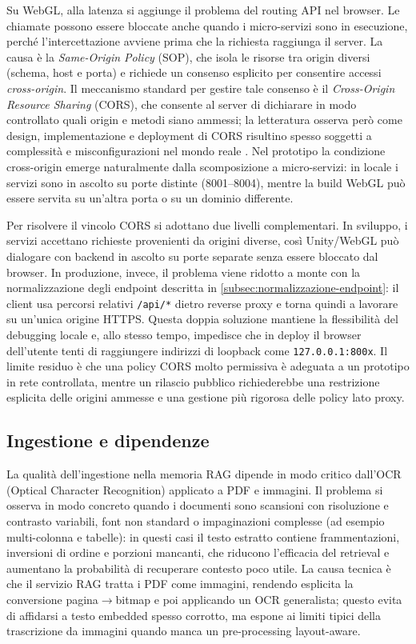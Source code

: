 Su WebGL, alla latenza si aggiunge il problema del routing API nel browser. Le chiamate possono essere bloccate anche quando i micro-servizi sono in esecuzione, perché l'intercettazione avviene prima che la richiesta raggiunga il server. La causa è la \emph{Same-Origin Policy} (SOP), che isola le risorse tra origin diversi (schema, host e porta) e richiede un consenso esplicito per consentire accessi \emph{cross-origin}. Il meccanismo standard per gestire tale consenso è il \emph{Cross-Origin Resource Sharing} (CORS), che consente al server di dichiarare in modo controllato quali origin e metodi siano ammessi; la letteratura osserva però come design, implementazione e deployment di CORS risultino spesso soggetti a complessità e misconfigurazioni nel mondo reale \cite{Chen2018CORS}. Nel prototipo la condizione cross-origin emerge naturalmente dalla scomposizione a micro-servizi: in locale i servizi sono in ascolto su porte distinte (8001--8004), mentre la build WebGL può essere servita su un'altra porta o su un dominio differente.

Per risolvere il vincolo CORS si adottano due livelli complementari. In sviluppo, i servizi accettano richieste provenienti da origini diverse, così Unity/WebGL può dialogare con backend in ascolto su porte separate senza essere bloccato dal browser. In produzione, invece, il problema viene ridotto a monte con la normalizzazione degli endpoint descritta in \autoref{subsec:normalizzazione-endpoint}: il client usa percorsi relativi \texttt{/api/*} dietro reverse proxy e torna quindi a lavorare su un'unica origine HTTPS. Questa doppia soluzione mantiene la flessibilità del debugging locale e, allo stesso tempo, impedisce che in deploy il browser dell'utente tenti di raggiungere indirizzi di loopback come \texttt{127.0.0.1:800x}. Il limite residuo è che una policy CORS molto permissiva è adeguata a un prototipo in rete controllata, mentre un rilascio pubblico richiederebbe una restrizione esplicita delle origini ammesse e una gestione più rigorosa delle policy lato proxy.

\subsection{Ingestione e dipendenze}\label{subsec:ocr-ingestione}\label{subsec:compatibilita-dipendenze}

La qualità dell'ingestione nella memoria RAG dipende in modo critico dall'OCR (Optical Character Recognition) applicato a PDF e immagini. Il problema si osserva in modo concreto quando i documenti sono scansioni con risoluzione e contrasto variabili, font non standard o impaginazioni complesse (ad esempio multi-colonna e tabelle): in questi casi il testo estratto contiene frammentazioni, inversioni di ordine e porzioni mancanti, che riducono l'efficacia del retrieval e aumentano la probabilità di recuperare contesto poco utile. La causa tecnica è che il servizio RAG tratta i PDF come immagini, rendendo esplicita la conversione pagina$\rightarrow$bitmap e poi applicando un OCR generalista; questo evita di affidarsi a testo embedded spesso corrotto, ma espone ai limiti tipici della trascrizione da immagini quando manca un pre-processing layout-aware.

